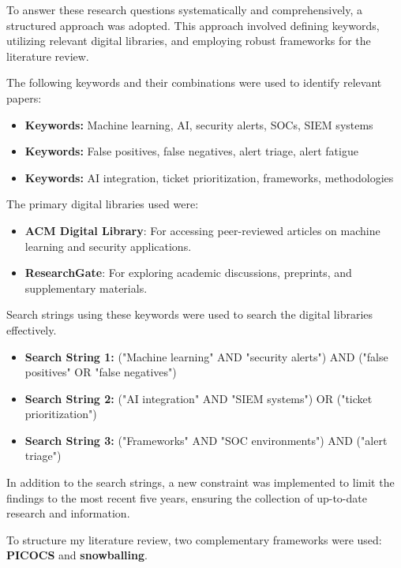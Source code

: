 To answer these research questions systematically and comprehensively, a structured approach was adopted. 
This approach involved defining keywords, utilizing relevant digital libraries, and employing robust frameworks for the literature review.

The following keywords and their combinations were used to identify relevant papers:
\begin{itemize}
    \item \textbf{Keywords:} Machine learning, AI, security alerts, SOCs, SIEM systems
    \item \textbf{Keywords:} False positives, false negatives, alert triage, alert fatigue
    \item \textbf{Keywords:} AI integration, ticket prioritization, frameworks, methodologies
\end{itemize}

The primary digital libraries used were:
\begin{itemize}
    \item \textbf{ACM Digital Library}: For accessing peer-reviewed articles on machine learning and security applications.
    \item \textbf{ResearchGate}: For exploring academic discussions, preprints, and supplementary materials.
\end{itemize}

Search strings using these keywords were used to search the digital libraries effectively.
\begin{itemize}
    \item \textbf{Search String 1:} ("Machine learning" AND "security alerts") AND ("false positives" OR "false negatives")
    \item \textbf{Search String 2:} ("AI integration" AND "SIEM systems") OR ("ticket prioritization")
    \item \textbf{Search String 3:} ("Frameworks" AND "SOC environments") AND ("alert triage")
\end{itemize}

In addition to the search strings, a new constraint was implemented to limit the findings to the most recent five years, ensuring the collection of up-to-date research and information.

To structure my literature review, two complementary frameworks were used: \textbf{PICOCS} and \textbf{snowballing}.

